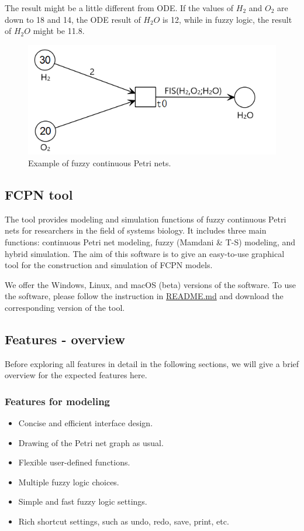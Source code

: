 \documentclass[journal,a4paper,onecolumn]{article}
\begin{document}
The result might be a little different from ODE. If the values of $H_2$ and $O_2$ are down to 18 and 14, the ODE result of $H_2O$ is 12, while in fuzzy logic, the result of $H_2O$ might be 11.8. 
\begin{figure}[!hbt]
	\begin{center}
		\includegraphics[width=0.5\columnwidth]{fig50}
		\caption{Example of fuzzy continuous Petri nets.}
		\label{fig:Example of fuzzy continuous Petri nets}
	\end{center}
\end{figure}


\subsection{FCPN tool}

The tool provides modeling and simulation functions of fuzzy continuous Petri nets for researchers in the field of systems biology.
It includes three main functions: continuous Petri net modeling, fuzzy (Mamdani \& T-S) modeling, and hybrid simulation. 
The aim of this software is to give an easy-to-use graphical tool for the construction and simulation of FCPN models.

We offer the Windows, Linux, and macOS (beta) versions of the software. To use the software, please follow the instruction in \href{https://github.com/liufei2016/fcpn/blob/master/README.md}{README.md} and download the corresponding version of the tool.


\subsection{Features - overview}
Before exploring all features in detail in the following sections, we will give a brief overview for the expected features here.

\subsubsection{Features for modeling}
\begin{itemize}
	\item Concise and efficient interface design.
	\item Drawing of the Petri net graph as usual.
	\item Flexible user-defined functions.
	\item Multiple fuzzy logic choices.
	\item Simple and fast fuzzy logic settings.
	\item Rich shortcut settings, such as undo, redo, save, print, etc.
\end{itemize}
\end{document}
